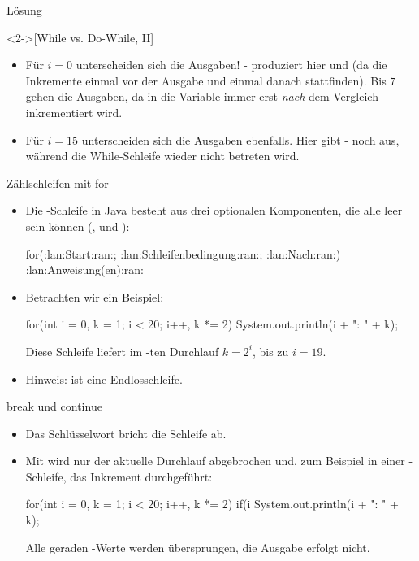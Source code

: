     \begin{frame}[c,fragile]{Lösung}
        \begin{solve}<2->[While vs. Do-While, II]
            \begin{itemize}[<+(1)->]
            \item Für \(i = 0\) unterscheiden sich die Ausgaben! - produziert hier  und   (da die Inkremente einmal vor der Ausgabe und einmal danach stattfinden). Bis \(7\) gehen die Ausgaben, da in  die Variable  immer erst \emph{nach} dem Vergleich inkrementiert wird.
            \item Für \(i = 15\) unterscheiden sich die Ausgaben ebenfalls. Hier gibt - noch  aus, während die While-Schleife wieder nicht betreten wird.
            \end{itemize}
        \end{solve}
    \end{frame}
\fi

\begin{frame}[fragile]{Zählschleifen mit for}
    \begin{itemize}[<+(1)->]
        \widei
        \item Die -Schleife in Java besteht aus drei optionalen Komponenten,\pause{} die alle leer sein können (,   und ):
        \begin{plainjava}
for(:lan:Start:ran:; :lan:Schleifenbedingung:ran:; :lan:Nach:ran:) {
    :lan:Anweisung(en):ran:
}
        \end{plainjava}
        \item Betrachten wir ein Beispiel:\pause{}
\begin{plainjava}
for(int i = 0, k = 1; i < 20; i++, k *= 2)
    System.out.println(i + ": " + k);
\end{plainjava}
    \pause{}Diese Schleife liefert im -ten Durchlauf \(k = 2^i\),\pause{} bis zu \(i = 19\).
        \item Hinweis:  ist eine Endlosschleife.
    \end{itemize}
\end{frame}

\begin{frame}[fragile]{break und continue}
    \begin{itemize}[<+(1)->]
        \widei
        \item Das Schlüsselwort  bricht die  Schleife ab.
        \item Mit  wird nur der aktuelle Durchlauf abgebrochen und,\pause{} zum Beispiel in einer -Schleife,\pause{} das Inkrement durchgeführt:\pause{}
\begin{plainjava}
for(int i = 0, k = 1; i < 20; i++, k *= 2) {
    if(i %
    System.out.println(i + ": " + k);
}
\end{plainjava}
        \pause{}Alle geraden -Werte werden übersprungen, die Ausgabe erfolgt nicht.
    \end{itemize}
\end{frame}

